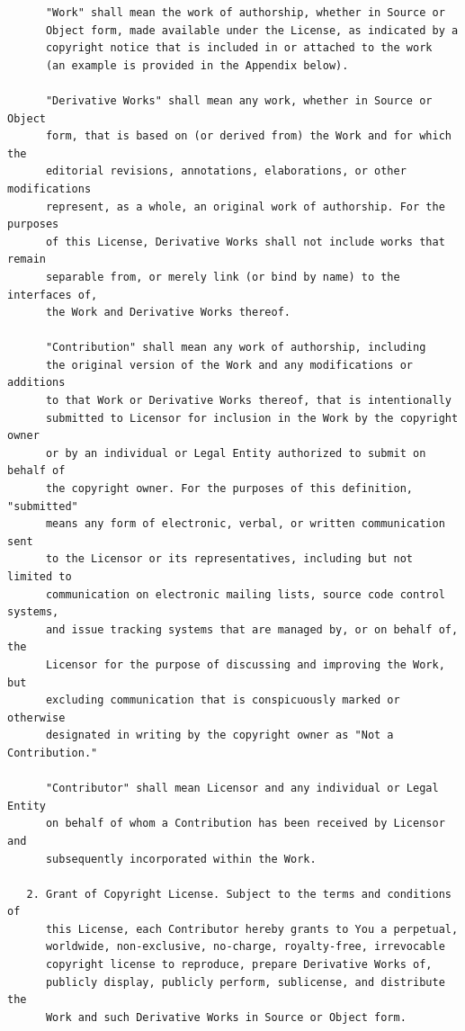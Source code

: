 \documentclass{book}
\begin{document}
\begin{verbatim}
      "Work" shall mean the work of authorship, whether in Source or
      Object form, made available under the License, as indicated by a
      copyright notice that is included in or attached to the work
      (an example is provided in the Appendix below).

      "Derivative Works" shall mean any work, whether in Source or Object
      form, that is based on (or derived from) the Work and for which the
      editorial revisions, annotations, elaborations, or other modifications
      represent, as a whole, an original work of authorship. For the purposes
      of this License, Derivative Works shall not include works that remain
      separable from, or merely link (or bind by name) to the interfaces of,
      the Work and Derivative Works thereof.

      "Contribution" shall mean any work of authorship, including
      the original version of the Work and any modifications or additions
      to that Work or Derivative Works thereof, that is intentionally
      submitted to Licensor for inclusion in the Work by the copyright owner
      or by an individual or Legal Entity authorized to submit on behalf of
      the copyright owner. For the purposes of this definition, "submitted"
      means any form of electronic, verbal, or written communication sent
      to the Licensor or its representatives, including but not limited to
      communication on electronic mailing lists, source code control systems,
      and issue tracking systems that are managed by, or on behalf of, the
      Licensor for the purpose of discussing and improving the Work, but
      excluding communication that is conspicuously marked or otherwise
      designated in writing by the copyright owner as "Not a Contribution."

      "Contributor" shall mean Licensor and any individual or Legal Entity
      on behalf of whom a Contribution has been received by Licensor and
      subsequently incorporated within the Work.

   2. Grant of Copyright License. Subject to the terms and conditions of
      this License, each Contributor hereby grants to You a perpetual,
      worldwide, non-exclusive, no-charge, royalty-free, irrevocable
      copyright license to reproduce, prepare Derivative Works of,
      publicly display, publicly perform, sublicense, and distribute the
      Work and such Derivative Works in Source or Object form.


\end{verbatim}
\end{document}
